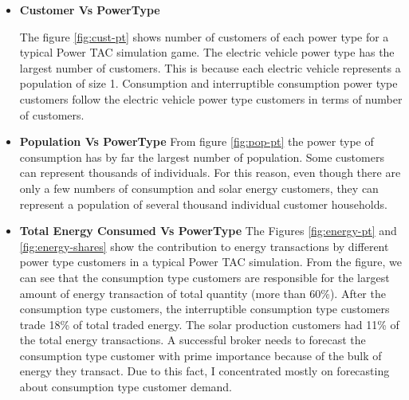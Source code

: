 \begin{itemize}
\item \textbf{Customer Vs PowerType}

The figure \ref{fig:cust-pt} shows number of customers of each power type for a typical Power TAC simulation game. The electric vehicle power type has the largest number of customers. This is because each electric vehicle represents a population of size 1. Consumption and interruptible consumption power type customers follow the electric vehicle power type customers in terms of number of customers. 

\item \textbf{Population Vs PowerType}
From figure \ref{fig:pop-pt} the power type of consumption has by far the largest number of population. Some customers can represent thousands of individuals. For this reason, even though there are only a few numbers of consumption and solar energy customers, they can represent a population of several thousand individual customer households. 

\item \textbf{Total Energy Consumed Vs PowerType}
The Figures \ref{fig:energy-pt} and \ref{fig:energy-shares} show the contribution to energy transactions by different power type customers in a typical Power TAC simulation. From the figure, we can see that the consumption type customers are responsible for the largest amount of energy transaction of total quantity (more than 60\%). After the consumption type customers, the interruptible consumption type customers trade 18\% of total traded energy. The solar production customers had 11\% of the total energy transactions. A successful broker needs to forecast the consumption type customer with prime importance because of the bulk of energy they transact. Due to this fact, I concentrated mostly on forecasting about consumption type customer demand.



\end{itemize}
